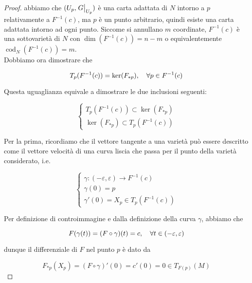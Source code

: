 \begin{proof}
	abbiamo che $ (U_{p},\eval{G}_{U_{p}}) $ è una carta adattata di $ N $ intorno a $ p $ relativamente a $ F^{-1}(c) $, ma $ p $ è un punto arbitrario, quindi esiste una carta adattata intorno ad ogni punto. Siccome si annullano $ m $ coordinate, $ F^{-1}(c) $ è una sottovarietà di $ N $ con $ \dim(F^{-1}(c)) = n-m $ o equivalentemente $ \operatorname{cod}_{N}(F^{-1}(c)) = m $. \\
	Dobbiamo ora dimostrare che
	
	\begin{equation}
		T_{p}(F^{-1}(c)) = \ker(F_{*p}) \qcomma \forall p \in F^{-1}(c)
	\end{equation} 
	
	Questa uguaglianza equivale a dimostrare le due inclusioni seguenti:
	
	\begin{equation}
		\begin{cases}
			T_{p}(F^{-1}(c)) \subset \ker(F_{*p}) \\
			\ker(F_{*p}) \subset T_{p}(F^{-1}(c))
		\end{cases}
	\end{equation}
	
	Per la prima, ricordiamo che il vettore tangente a una varietà può essere descritto come il vettore velocità di una curva liscia che passa per il punto della varietà considerato, i.e.
	
	\begin{equation}
		\begin{cases}
			\gamma : (-\varepsilon,\varepsilon) \to F^{-1}(c) \\
			\gamma(0) = p \\
			\gamma'(0) = X_{p} \in T_{p}(F^{-1}(c))
		\end{cases}
	\end{equation}

	Per definizione di controimmagine e dalla definizione della curva $ \gamma $, abbiamo che
	
	\begin{equation}
		F(\gamma(t)) = (F \circ \gamma)(t) = c \qcomma \forall t \in (-\varepsilon,\varepsilon)
	\end{equation}
	
	dunque il differenziale di $ F $ nel punto $ p $ è dato da
	
	\begin{equation}
		F_{*p}(X_{p}) = (F \circ \gamma)'(0) %
		= c'(0) %
		= 0 \in T_{F(p)}(M)
	\end{equation}


\end{proof}
